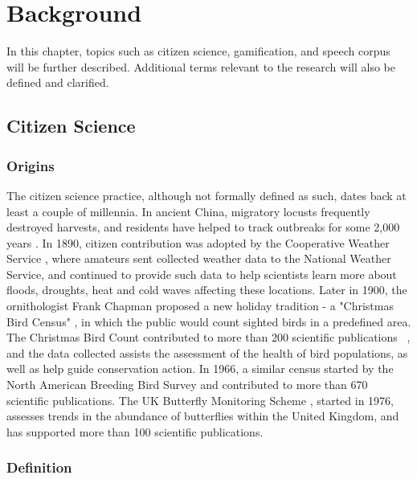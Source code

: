 \chapter{Background}
\label{chap:background}

In this chapter, topics such as citizen science, gamification, and speech corpus will be further described. Additional terms relevant to the research will also be defined and clarified. 

\section{Citizen Science}

\subsection{Origins}

The citizen science practice, although not formally defined as such, dates back at least a couple of millennia. In ancient China, migratory locusts frequently destroyed harvests, and residents have helped to track outbreaks for some 2,000 years \cite{irwin2018no}. In 1890, citizen contribution was adopted by the Cooperative Weather Service \cite{quayle1991effects}, where amateurs 
sent collected weather data to the National Weather Service, and continued to provide such data to help scientists learn more about floods, droughts, heat and cold waves affecting these locations. Later in 1900, the ornithologist Frank Chapman proposed a new holiday tradition - a "Christmas Bird Census" \cite{harden1985christmas}, in which the public would count sighted birds in a predefined area. The Christmas Bird Count contributed to more than 200 scientific publications
~\cite{kosmala2016assessing}, and the data collected assists the assessment of the health of bird populations, as well as help guide conservation action. In 1966, a similar census started by the North American Breeding Bird Survey and contributed to more than 670 scientific publications. The UK Butterfly Monitoring Scheme \cite{pollard1994monitoring}, started in 1976, assesses trends in the abundance of butterflies within the United Kingdom, and has supported more than 100 scientific publications.

\subsection{Definition}

